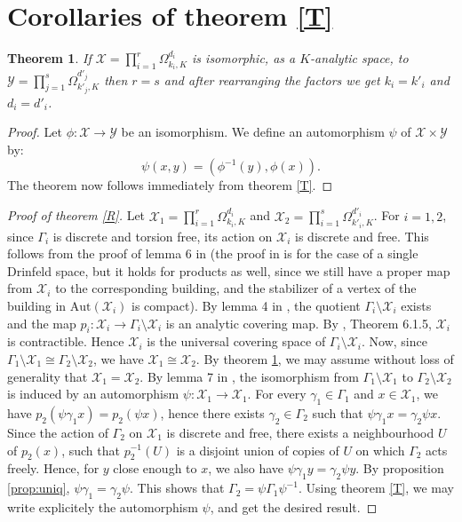 \documentclass{amsart}
\theoremstyle{theorem}
\newtheorem{theorem}{Theorem}
\theoremstyle{lemma}
\theoremstyle{prop}
\theoremstyle{definition}
\theoremstyle{corollary}
\theoremstyle{remark}
\newcommand{\X}{\mathcal{X}}
\newcommand{\Y}{\mathcal{Y}}
\newcommand{\Aut}{\text{Aut}}
\begin{document}

\section{Corollaries of theorem \ref{T}}

\begin{theorem} \label{S}
If $\X=\prod_{i=1}^r\Omega_{k_i,K}^{d_i}$ is isomorphic, as a $K$-analytic space, to $\Y=\prod_{j=1}^s\Omega_{k'_j,K}^{d'_j}$ then $r=s$ and after rearranging the factors we get $k_i = k'_i$ and $d_i=d'_i$. \end{theorem} \begin{proof} Let $\phi: \X \rightarrow \Y$ be an isomorphism. We define an automorphism $\psi$ of $\X \times \Y$ by:
$$ \psi(x,y)=(\phi^{-1}(y), \phi(x)). $$ The theorem now follows immediately from theorem \ref{T}. \end{proof}


\begin{proof}[Proof of theorem \ref{R}] Let $\X_1= \prod_{i=1}^r\Omega_{k_i,K}^{d_i}$ and $\X_2=\prod_{i=1}^s\Omega_{k'_i,K}^{d'_i}$. 
For $i=1,2$, since $\Gamma_i$ is discrete and torsion free, its action on $\X_i$ is discrete and free. This follows from the proof of lemma 6 in \cite{ber} (the proof in \cite{ber} is for the case of a single Drinfeld space, but it holds for products as well, since we still have a proper map from $\X_i$ to the corresponding building, and the stabilizer of a vertex of the building in $\Aut(\X_i)$ is compact). By lemma 4 in \cite{ber}, the quotient $\Gamma_i \setminus \X_i$ exists and the map $p_i:\X_i \rightarrow  \Gamma_i \setminus \X_i$ is an analytic covering map. By \cite{ber}, Theorem 6.1.5, $\X_i$ is contractible. Hence $\X_i$ is the universal covering space of $\Gamma_i \setminus \X_i$. Now, since $\Gamma_1 \setminus \X_1 \cong \Gamma_2 \setminus \X_2$, we have $\X_1 \cong \X_2$. By theorem \ref{S}, we may assume without loss of generality that $\X_1=\X_2$. By lemma 7 in \cite{ber}, the isomorphism from  $\Gamma_1 \setminus \X_1$ to  $\Gamma_2 \setminus \X_2$ is induced by an automorphism $\psi: \X_1 \rightarrow \X_1$. 
For every $\gamma_1 \in \Gamma_1$ and $x\in \X_1$, we have $p_2(\psi \gamma_1 x )=p_2(\psi x )$, hence there exists $\gamma_2 \in \Gamma_2$ such that $\psi \gamma_1 x = \gamma_2 \psi x$. Since the action of $\Gamma_2$ on $\X_1$ is discrete and free, there exists a neighbourhood $U$ of $p_2(x)$, such that $p_2^{-1}(U)$ is a disjoint union of copies of $U$ on which $\Gamma_2$ acts freely. Hence, for $y$ close enough to $x$, we also have $\psi \gamma_1 y = \gamma_2 \psi y$. By proposition \ref{prop:uniq}, $\psi \gamma_1 = \gamma_2 \psi$. This shows that $\Gamma_2= \psi \Gamma_1 \psi ^{-1}$. Using theorem \ref{T}, we may write explicitely the automorphism $\psi$, and get the desired result.\end{proof}
\end{document}
